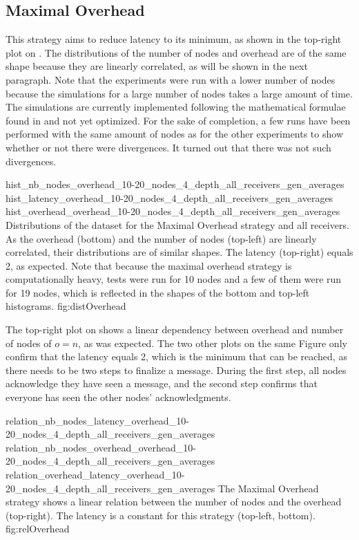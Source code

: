 \FloatBarrier
\subsection{Maximal Overhead}
This strategy aims to reduce latency to its minimum, as shown in the
top-right plot on . The distributions of the number
of nodes and overhead are of the same shape because they are linearly
correlated, as will be shown in the next paragraph. 
Note that the experiments were run with a lower number of nodes because the
simulations for a large number of nodes takes a large amount of time. The
simulations are currently implemented following the mathematical formulae found
in \cite{abstractCBC} and not yet optimized. For the sake of completion, a few runs
have been performed with the same amount of nodes as for the other experiments
to show whether or not there were divergences. It turned out that there was not
such divergences. 

\triplefigure
    {hist_nb_nodes_overhead_10-20_nodes_4_depth_all_receivers_gen_averages}
    {hist_latency_overhead_10-20_nodes_4_depth_all_receivers_gen_averages}
    {hist_overhead_overhead_10-20_nodes_4_depth_all_receivers_gen_averages}
    {Distributions of the dataset for the Maximal Overhead strategy and all
    receivers. As the overhead (bottom) and the number of nodes (top-left) are
    linearly correlated, their distributions are of similar shapes. The
    latency (top-right) equals 2, as expected. Note that because the maximal
    overhead strategy is computationally heavy, tests were run for 10 nodes and
    a few of them were run for 19 nodes, which is reflected in the shapes of the
    bottom and top-left histograms.}
    {fig:distOverhead}

The top-right plot on  shows a linear dependency between
overhead and number of nodes of \(o = n\), as was expected.  The two other plots
on the same Figure only confirm that the latency equals 2, which is the minimum
that can be reached, as there needs to be two steps to finalize a message.
During the first step, all nodes acknowledge they have seen a message, and the
second step confirms that everyone has seen the other nodes' acknowledgments.

\triplefigure
    {relation_nb_nodes_latency_overhead_10-20_nodes_4_depth_all_receivers_gen_averages}
    {relation_nb_nodes_overhead_overhead_10-20_nodes_4_depth_all_receivers_gen_averages}
    {relation_overhead_latency_overhead_10-20_nodes_4_depth_all_receivers_gen_averages}
    {The Maximal Overhead strategy shows a linear relation between the number of
    nodes and the overhead (top-right). The latency is a constant for this
    strategy (top-left, bottom).}
    {fig:relOverhead}

